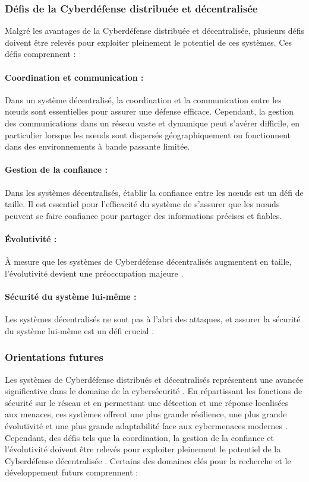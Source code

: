 \subsubsection{Défis de la Cyberdéfense distribuée et décentralisée}

Malgré les avantages de la Cyberdéfense distribuée et décentralisée, plusieurs défis doivent être relevés pour exploiter pleinement le potentiel de ces systèmes. Ces défis comprennent :

\paragraph{Coordination et communication :}
Dans un système décentralisé, la coordination et la communication entre les nœuds sont essentielles pour assurer une défense efficace. Cependant, la gestion des communications dans un réseau vaste et dynamique peut s'avérer difficile, en particulier lorsque les nœuds sont dispersés géographiquement ou fonctionnent dans des environnements à bande passante limitée.

\paragraph{Gestion de la confiance :}
Dans les systèmes décentralisés, établir la confiance entre les nœuds est un défi de taille. Il est essentiel pour l'efficacité du système de s'assurer que les nœuds peuvent se faire confiance pour partager des informations précises et fiables.

\paragraph{Évolutivité :}
À mesure que les systèmes de Cyberdéfense décentralisés augmentent en taille, l'évolutivité devient une préoccupation majeure \cite{Bera2017}.

\paragraph{Sécurité du système lui-même :}
Les systèmes décentralisés ne sont pas à l’abri des attaques, et assurer la sécurité du système lui-même est un défi crucial \cite{Roman2013}.

\subsubsection{Orientations futures}

Les systèmes de Cyberdéfense distribués et décentralisés représentent une avancée significative dans le domaine de la cybersécurité \cite{Christidis2016}. En répartissant les fonctions de sécurité sur le réseau et en permettant une détection et une réponse localisées aux menaces, ces systèmes offrent une plus grande résilience, une plus grande évolutivité et une plus grande adaptabilité face aux cybermenaces modernes \cite{Roman2013}. Cependant, des défis tels que la coordination, la gestion de la confiance et l'évolutivité doivent être relevés pour exploiter pleinement le potentiel de la Cyberdéfense décentralisée \cite{Xu2019}.
Certains des domaines clés pour la recherche et le développement futurs comprennent :

